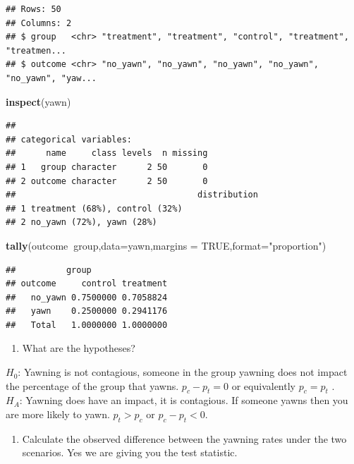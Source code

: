 \documentclass[
]{book}
\newenvironment{Shaded}{\begin{snugshade}}{\end{snugshade}}
\newcommand{\DataTypeTok}[1]{\textcolor[rgb]{0.13,0.29,0.53}{#1}}
\newcommand{\KeywordTok}[1]{\textcolor[rgb]{0.13,0.29,0.53}{\textbf{#1}}}
\newcommand{\NormalTok}[1]{#1}
\newcommand{\OperatorTok}[1]{\textcolor[rgb]{0.81,0.36,0.00}{\textbf{#1}}}
\newcommand{\OtherTok}[1]{\textcolor[rgb]{0.56,0.35,0.01}{#1}}
\newcommand{\StringTok}[1]{\textcolor[rgb]{0.31,0.60,0.02}{#1}}
\providecommand{\tightlist}{%
  \setlength{\itemsep}{0pt}\setlength{\parskip}{0pt}}
\begin{document}
\begin{verbatim}
## Rows: 50
## Columns: 2
## $ group   <chr> "treatment", "treatment", "control", "treatment", "treatmen...
## $ outcome <chr> "no_yawn", "no_yawn", "no_yawn", "no_yawn", "no_yawn", "yaw...
\end{verbatim}

\begin{Shaded}
\begin{Highlighting}[]
\KeywordTok{inspect}\NormalTok{(yawn)}
\end{Highlighting}
\end{Shaded}

\begin{verbatim}
## 
## categorical variables:  
##      name     class levels  n missing
## 1   group character      2 50       0
## 2 outcome character      2 50       0
##                                    distribution
## 1 treatment (68%), control (32%)               
## 2 no_yawn (72%), yawn (28%)
\end{verbatim}

\begin{Shaded}
\begin{Highlighting}[]
\KeywordTok{tally}\NormalTok{(outcome}\OperatorTok{~}\NormalTok{group,}\DataTypeTok{data=}\NormalTok{yawn,}\DataTypeTok{margins =} \OtherTok{TRUE}\NormalTok{,}\DataTypeTok{format=}\StringTok{"proportion"}\NormalTok{)}
\end{Highlighting}
\end{Shaded}

\begin{verbatim}
##          group
## outcome     control treatment
##   no_yawn 0.7500000 0.7058824
##   yawn    0.2500000 0.2941176
##   Total   1.0000000 1.0000000
\end{verbatim}

\begin{enumerate}
\def\labelenumi{\alph{enumi}.}
\tightlist
\item
  What are the hypotheses?
\end{enumerate}

\(H_0\): Yawning is not contagious, someone in the group yawning does not impact the percentage of the group that yawns. \(p_c - p_t = 0\) or equivalently \(p_c = p_t\) .\\
\(H_A\): Yawning does have an impact, it is contagious. If someone yawns then you are more likely to yawn. \(p_t > p_c\) or \(p_c - p_t < 0\).

\begin{enumerate}
\def\labelenumi{\alph{enumi}.}
\setcounter{enumi}{1}
\tightlist
\item
  Calculate the observed difference between the yawning rates under the two scenarios. Yes we are giving you the test statistic.
\end{enumerate}
\end{document}
